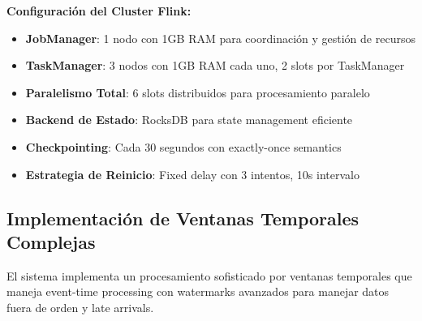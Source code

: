 \vspace{0.3cm}

\textbf{Configuración del Cluster Flink:}

\begin{itemize}[leftmargin=*, itemsep=0.1cm]
\item \textbf{JobManager}: 1 nodo con 1GB RAM para coordinación y gestión de recursos
\item \textbf{TaskManager}: 3 nodos con 1GB RAM cada uno, 2 slots por TaskManager
\item \textbf{Paralelismo Total}: 6 slots distribuidos para procesamiento paralelo
\item \textbf{Backend de Estado}: RocksDB para state management eficiente
\item \textbf{Checkpointing}: Cada 30 segundos con exactly-once semantics
\item \textbf{Estrategia de Reinicio}: Fixed delay con 3 intentos, 10s intervalo
\end{itemize}

\subsection{Implementación de Ventanas Temporales Complejas}
\label{subsec:ventanas_temporales}

El sistema implementa un procesamiento sofisticado por ventanas temporales que maneja event-time processing con watermarks avanzados para manejar datos fuera de orden y late arrivals.

\vspace{0.2cm}

